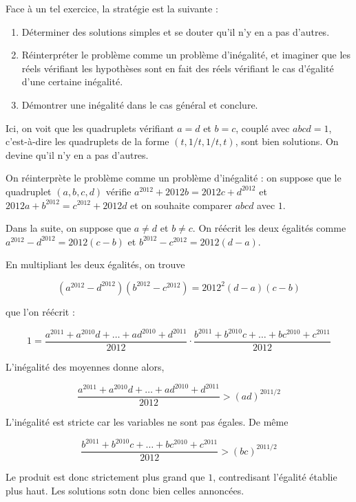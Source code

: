 \begin{sol}
Face à un tel exercice, la stratégie est la suivante :

\begin{enumerate}
\item Déterminer des solutions simples et se douter qu'il n'y en a pas d'autres.
\item Réinterpréter le problème comme un problème d'inégalité, et imaginer que les réels vérifiant les hypothèses sont en fait des réels vérifiant le cas d'égalité d'une certaine inégalité.
\item Démontrer une inégalité dans le cas général et conclure.
\end{enumerate}

Ici, on voit que les quadruplets vérifiant $a=d$ et $b=c$, couplé avec $abcd=1$, c'est-à-dire les quadruplets de la forme $(t, 1/t, 1/t, t)$, sont bien solutions. On devine qu'il n'y en a pas d'autres.

On réinterprète le problème comme un problème d'inégalité : on suppose que le quadruplet $(a,b,c,d)$ vérifie $a^{2012}+2012b=2012c+d^{2012}$ et $2012a+b^{2012}=c^{2012}+2012d$ et on souhaite comparer $abcd$ avec $1$.

\medskip

Dans la suite, on suppose que $a\neq d$ et $b\neq c$. On réécrit les deux égalités comme $a^{2012}-d^{2012}=2012(c-b)$ et $b^{2012}-c^{2012}=2012(d-a)$.

En multipliant les deux égalités, on trouve

\[(a^{2012}-d^{2012})(b^{2012}-c^{2012})= 2012^2 (d-a)(c-b)\]

que l'on réécrit :

\[1= \frac{a^{2011}+a^{2010}d+ \ldots +ad^{2010}+d^{2011}}{2012} \cdot \frac{b^{2011}+b^{2010}c+ \ldots +bc^{2010}+c^{2011}}{2012}\]

L'inégalité des moyennes donne alors,

\[ \frac{a^{2011}+a^{2010}d+ \ldots +ad^{2010}+d^{2011}}{2012} > (ad)^{2011/2}\]

L'inégalité est stricte car les variables ne sont pas égales. De même

\[\frac{b^{2011}+b^{2010}c+ \ldots +bc^{2010}+c^{2011}}{2012}> (bc)^{2011/2}\]

Le produit est donc strictement plus grand que $1$, contredisant l'égalité établie plus haut. Les solutions sotn donc bien celles annoncées.

\end{sol}

